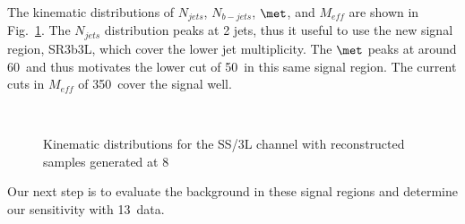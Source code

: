 
The kinematic distributions of $N_{jets}$, $N_{b-jets}$, $\met$, and $M_{eff}$ are shown in Fig.~\ref{fig:3l3b_distributions}. The $N_{jets}$ distribution peaks at 2 jets, thus it useful to use the new signal region, SR3b3L, which cover the lower jet multiplicity. The $\met$ peaks at around 60~\GeV and thus motivates the lower cut of 50~\GeV in this same signal region. The current cuts in $M_{eff}$ of 350~\GeV cover the signal well. 


\begin{figure}[htb!]
\centering
{}
\\
\caption{ Kinematic distributions for the SS/3L channel with reconstructed samples generated at 8 \TeV}
\label{fig:3l3b_distributions}
\end{figure}



Our next step is to evaluate the background in these signal regions and determine our sensitivity with 13~\TeV data. 


